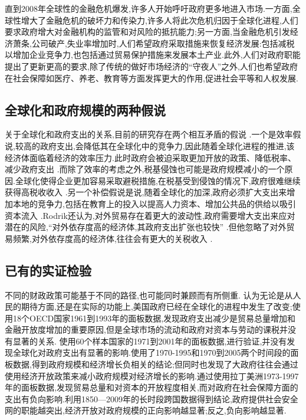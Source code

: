 \documentclass[10pt]{article}
\begin{document}
    直到2008年全球性的金融危机爆发,许多人开始呼吁政府更多地进入市场.一方面,全球性增大了金融危机的破坏力和传染力,许多人将此次危机归因于全球化进程,人们要求政府增大对金融机构的监管和对风险的抵抗能力;另一方面,当金融危机引发经济萧条,公司破产,失业率增加时,人们希望政府采取措施来恢复经济发展:包括减税以增加企业竞争力,也包括通过贸易保护措施来发展本土产业.此外,人们对政府职能提出了更新更高的要求,除了传统的做好市场经济的“守夜人”之外,人们也希望政府在社会保障如医疗、养老、教育等方面发挥更大的作用,促进社会平等和人权发展.
    \subsection{全球化和政府规模的两种假说}
    关于全球化和政府支出的关系,目前的研究存在两个相互矛盾的假说 \cite{garrett2001globalization} .一个是效率假说,较高的政府支出,会降低其在全球化中的竞争力,因此随着全球化进程的推进,该经济体面临着经济的效率压力.此时政府会被迫采取更加开放的政策、降低税率、减少政府支出 \cite{wangyu2014} .而除了效率的考虑之外,税基侵蚀也可能是政府规模减小的一个原因.全球化使得企业更加容易采取避税措施,在税基受到侵蚀的情况下,政府很难继续获得高税收收入 \cite{tanzi2000globalization} .另一个补偿假说是说,随着全球化的加深,政府必须扩大支出来增加本地的竞争力,包括在教育上的投入以提高人力资本、增加公共品的供给以吸引资本流入 \cite{rodrik1998more} .Rodrik还认为,对外贸易存在着更大的波动性,政府需要增大支出来应对潜在的风险,“对外依存度高的经济体,其政府支出扩张也较快”  \cite{rodrik1998more} .但他忽略了对外贸易频繁,对外依存度高的经济体,往往会有更大的关税收入 \cite{tanzi1973theory}.
    \subsection{已有的实证检验}
    不同的财政政策可能基于不同的路径,也可能同时兼顾而有所侧重.\cite{kettl2000transformation} 认为无论是从人民的期待方面,还是在实际的功能上,美国政府已经在全球化的进程中发生了改变;\cite{garrett2001globalization}使用18个OECD国家1961到1993年的面板数据,发现政府支出减少是贸易总量增加和金融开放度增加的重要原因,但是全球市场的流动和政府对资本与劳动的课税并没有显著的关系.\cite{dreher2008impact} 使用60个样本国家的1971到2001年的面板数据,进行验证,并没有发现全球化对政府支出有显著的影响.\cite{bergh2010government}使用了1970-1995和1970到2005两个时间段的面板数据,得到政府规模和经济增长负相关的结论;但同时也发现了大政府往往会通过使用经济开放政策来减小政府规模对经济增长的影响.\cite{kaufman2001globalization}通过使用拉丁美洲1973-1997年的面板数据,发现贸易总量和对资本的开放程度相关,而对政府在社会保障方面的支出有负向影响.\cite{maojie2015}利用1850—2009年的长时段跨国数据得到结论,政府提供社会安全网的职能越突出,经济开放对政府规模的正向影响越显著;反之,负向影响越显著.
\end{document}
